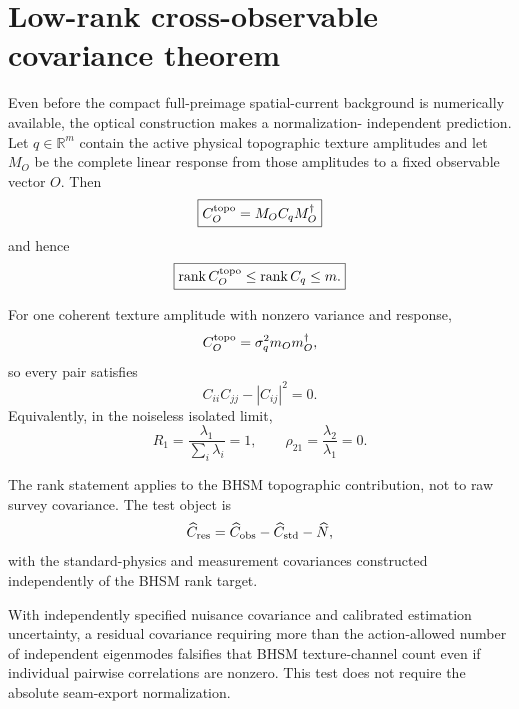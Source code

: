 \section{Low-rank cross-observable covariance theorem}
\label{sec:bhsm-optical-low-rank}

Even before the compact full-preimage spatial-current background is
numerically available, the optical construction makes a normalization-
independent prediction.  Let $q\in\mathbb R^m$ contain the active physical
topographic texture amplitudes and let $M_O$ be the complete linear response
from those amplitudes to a fixed observable vector $O$.  Then
\begin{equation}
\boxed{
C_O^{\rm topo}
=
M_O C_q M_O^\dagger
}
\end{equation}
and hence
\begin{equation}
\boxed{
{\rm rank}\,C_O^{\rm topo}
\le
{\rm rank}\,C_q
\le
m.
}
\end{equation}

For one coherent texture amplitude with nonzero variance and response,
\begin{equation}
C_O^{\rm topo}
=
\sigma_q^2 m_Om_O^\dagger,
\end{equation}
so every pair satisfies
\begin{equation}
\boxed{
C_{ii}C_{jj}-|C_{ij}|^2=0.
}
\end{equation}
Equivalently, in the noiseless isolated limit,
\begin{equation}
R_1=\frac{\lambda_1}{\sum_i\lambda_i}=1,
\qquad
\rho_{21}=\frac{\lambda_2}{\lambda_1}=0.
\end{equation}

The rank statement applies to the BHSM topographic contribution, not to raw
survey covariance.  The test object is
\begin{equation}
\widehat C_{\rm res}
=
\widehat C_{\rm obs}
-
\widehat C_{\rm std}
-
\widehat N,
\end{equation}
with the standard-physics and measurement covariances constructed
independently of the BHSM rank target.

With independently specified nuisance covariance and calibrated estimation uncertainty,
a residual covariance requiring more than the action-allowed number of
independent eigenmodes falsifies that BHSM texture-channel count even if
individual pairwise correlations are nonzero.  This test does not require the
absolute seam-export normalization.

